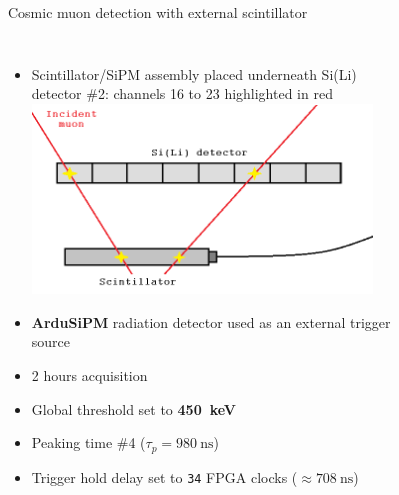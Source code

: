 \documentclass[aspectratio=169,xcolor=dvipsnames]{beamer} %
\begin{document}
\begin{frame}{Cosmic muon detection with external scintillator}
    \addtolength{\leftmargini}{\labelsep}
    \fontsize{9pt}{1}\selectfont
    \begin{columns}
        \begin{itemize}
            \item Scintillator/SiPM assembly placed underneath Si(Li) detector \#2: channels 16 to 23 highlighted in red
            \vskip0.4cm
            \includegraphics[width=0.9\textwidth]{images/muon_detection/scintillator_sensor_detail.png}
            \vskip0.4cm
            \item \textbf{ArduSiPM} radiation detector used as an external trigger source
            \item 2 hours acquisition
            \item Global threshold set to \textbf{\SI{450}{\kilo\electronvolt}}
            \item Peaking time \#4 ($\tau_{p} = \SI{980}{\nano\second}$)
            \item Trigger hold delay set to \texttt{34} FPGA clocks ($\approx \SI{708}{\nano\second}$)
        \end{itemize}
            \vskip-0.2cm
            \begin{figure}[h!]
                \centering
                \begin{tabular}{c c}

\end{tabular}
\end{figure}
\end{columns}
\end{frame}
\end{document}
